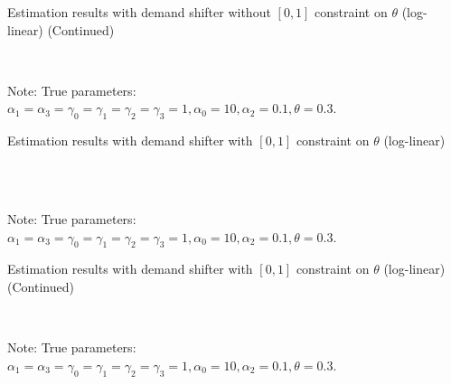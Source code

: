 \documentclass[11pt, a4paper]{article}
\begin{document}
\begin{table}[!htbp]
  \ContinuedFloat  %
  \begin{center}
      \caption{Estimation results with demand shifter without $[0,1]$ constraint on $\theta$ (log-linear) (Continued)}
      \label{tb:loglinear_loglinear_sigma_0.001_separate_non_constraint_non_constraint} 
      \subfloat[$\sigma=1.0$]{}\\
    \subfloat[$\sigma=2.0$]{}
  \end{center}\footnotesize
  Note: True parameters: $\alpha_1 = \alpha_3 = \gamma_0 = \gamma_1 = \gamma_2  = \gamma_3 = 1, \alpha_0 = 10, \alpha_2 = 0.1,  \theta = 0.3.$
\end{table} 



\begin{table}[!htbp]
  \begin{center}
      \caption{Estimation results with demand shifter with $[0,1]$ constraint on $\theta$ (log-linear)}
      \label{tb:loglinear_loglinear_sigma_0.001_separate_non_constraint_theta_constraint} 
      \subfloat[$\sigma=0.001$]{}\\
      \subfloat[$\sigma=0.5$]{}\\
  \end{center}\footnotesize
  Note: True parameters: $\alpha_1 = \alpha_3 = \gamma_0 = \gamma_1 = \gamma_2  = \gamma_3 = 1, \alpha_0 = 10, \alpha_2 = 0.1,  \theta = 0.3.$
\end{table} 

\begin{table}[!htbp]
  \ContinuedFloat  %
  \begin{center}
      \caption{Estimation results with demand shifter with $[0,1]$ constraint on $\theta$ (log-linear) (Continued)}
      \label{tb:loglinear_loglinear_sigma_0.001_separate_non_constraint_theta_constraint} 
      \subfloat[$\sigma=1.0$]{}\\
    \subfloat[$\sigma=2.0$]{}
  \end{center}\footnotesize
  Note: True parameters: $\alpha_1 = \alpha_3 = \gamma_0 = \gamma_1 = \gamma_2  = \gamma_3 = 1, \alpha_0 = 10, \alpha_2 = 0.1,  \theta = 0.3.$
\end{table} 
\end{document}
